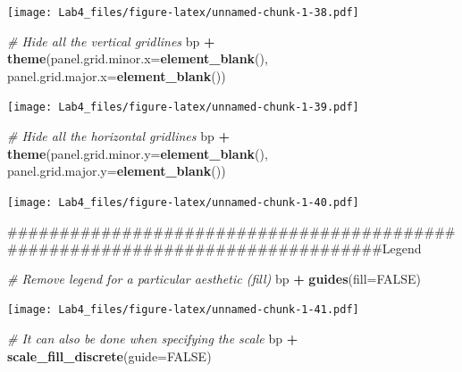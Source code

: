 \documentclass[]{article}
\newenvironment{Shaded}{\begin{snugshade}}{\end{snugshade}}
\newcommand{\KeywordTok}[1]{\textcolor[rgb]{0.13,0.29,0.53}{\textbf{#1}}}
\newcommand{\DataTypeTok}[1]{\textcolor[rgb]{0.13,0.29,0.53}{#1}}
\newcommand{\StringTok}[1]{\textcolor[rgb]{0.31,0.60,0.02}{#1}}
\newcommand{\CommentTok}[1]{\textcolor[rgb]{0.56,0.35,0.01}{\textit{#1}}}
\newcommand{\OtherTok}[1]{\textcolor[rgb]{0.56,0.35,0.01}{#1}}
\newcommand{\OperatorTok}[1]{\textcolor[rgb]{0.81,0.36,0.00}{\textbf{#1}}}
\newcommand{\NormalTok}[1]{#1}
\begin{document}
\texttt{[image: Lab4\_files/figure-latex/unnamed-chunk-1-38.pdf]}

\begin{Shaded}
\begin{Highlighting}[]
\CommentTok{# Hide all the vertical gridlines}
\NormalTok{bp }\OperatorTok{+}\StringTok{ }\KeywordTok{theme}\NormalTok{(}\DataTypeTok{panel.grid.minor.x=}\KeywordTok{element_blank}\NormalTok{(),}
           \DataTypeTok{panel.grid.major.x=}\KeywordTok{element_blank}\NormalTok{())}
\end{Highlighting}
\end{Shaded}

\texttt{[image: Lab4\_files/figure-latex/unnamed-chunk-1-39.pdf]}

\begin{Shaded}
\begin{Highlighting}[]
\CommentTok{# Hide all the horizontal gridlines}
\NormalTok{bp }\OperatorTok{+}\StringTok{ }\KeywordTok{theme}\NormalTok{(}\DataTypeTok{panel.grid.minor.y=}\KeywordTok{element_blank}\NormalTok{(),}
           \DataTypeTok{panel.grid.major.y=}\KeywordTok{element_blank}\NormalTok{())}
\end{Highlighting}
\end{Shaded}

\texttt{[image: Lab4\_files/figure-latex/unnamed-chunk-1-40.pdf]}

\begin{Shaded}
\begin{Highlighting}[]
\NormalTok{###############################################################################Legend}

\CommentTok{# Remove legend for a particular aesthetic (fill)}
\NormalTok{bp }\OperatorTok{+}\StringTok{ }\KeywordTok{guides}\NormalTok{(}\DataTypeTok{fill=}\OtherTok{FALSE}\NormalTok{)}
\end{Highlighting}
\end{Shaded}

\texttt{[image: Lab4\_files/figure-latex/unnamed-chunk-1-41.pdf]}

\begin{Shaded}
\begin{Highlighting}[]
\CommentTok{# It can also be done when specifying the scale}
\NormalTok{bp }\OperatorTok{+}\StringTok{ }\KeywordTok{scale_fill_discrete}\NormalTok{(}\DataTypeTok{guide=}\OtherTok{FALSE}\NormalTok{)}
\end{Highlighting}
\end{Shaded}
\end{document}
